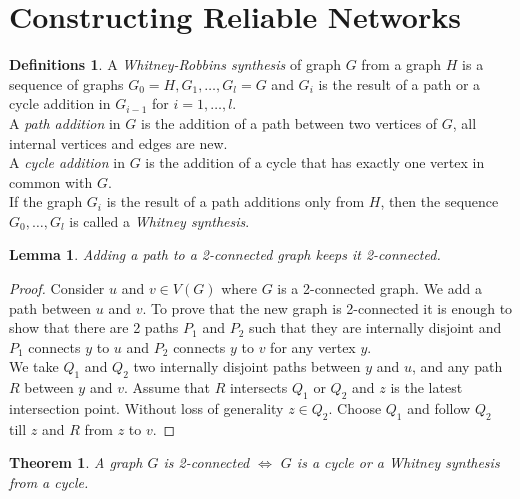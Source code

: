 \documentclass{article}
\newtheorem*{thm}{Theorem}
\newtheorem*{lem}{Lemma}
\theoremstyle{definition}
\newtheorem*{defns}{Definitions}
\begin{document}
\section{Constructing Reliable Networks}

\begin{defns}
A \emph{Whitney-Robbins synthesis} of graph $G$ from a graph $H$ is a sequence of graphs $G_0=H,G_1,\ldots,G_l=G$ and $G_i$ is the result of a path or a cycle addition in $G_{i-1}$ for $i=1,\ldots,l$. \\
A \emph{path addition} in $G$ is the addition of a path between two vertices of $G$, all internal vertices and edges are new. \\
A \emph{cycle addition} in $G$ is the addition of a cycle that has exactly one vertex in common with $G$. \\
If the graph $G_i$ is the result of a path additions only from $H$, then the sequence $G_0,\ldots,G_l$ is called a \emph{Whitney synthesis}.
\end{defns}


\begin{lem}
Adding a path to a 2-connected graph keeps it 2-connected.
\end{lem}

\begin{proof}
Consider $u$ and $v\in V(G)$ where $G$ is a 2-connected graph.
We add a path between $u$ and $v$.
To prove that the new graph is 2-connected it is enough to show that there are 2 paths $P_1$ and $P_2$ such that they are internally disjoint and $P_1$ connects $y$ to $u$ and $P_2$ connects $y$ to $v$ for any vertex $y$. \\
We take $Q_1$ and $Q_2$ two internally disjoint paths between $y$ and $u$, and any path $R$ between $y$ and $v$.
Assume that $R$ intersects $Q_1$ or $Q_2$ and $z$ is the latest intersection point.
Without loss of generality $z\in Q_2$.
Choose $Q_1$ and follow $Q_2$ till $z$ and $R$ from $z$ to $v$.
\end{proof}

\begin{thm}
A graph $G$ is 2-connected $\iff$ $G$ is a cycle or a Whitney synthesis from a cycle.
\end{thm}
\end{document}
